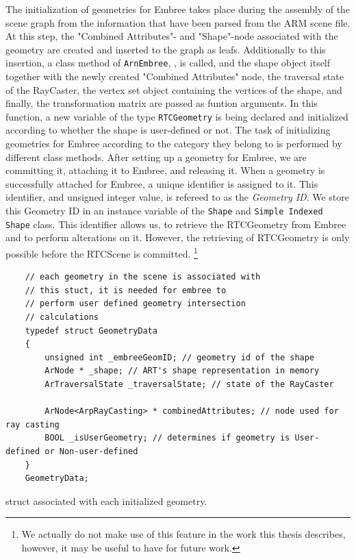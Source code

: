 The initialization of geometries for Embree takes place during the assembly of the scene graph from the information that have been parsed from the ARM scene file. At this step, the "Combined Attributes"- and "Shape"-node associated with the geometry are created and inserted to the graph as leafs. Additionally to this insertion, a class method of \texttt{ArnEmbree}, , is called, and the shape object itself together with the newly created "Combined Attributes" node, the traversal state  of the RayCaster, the vertex set object containing the vertices of the shape, and finally, the transformation matrix are passed as funtion arguments. In this function, a new variable of the type \texttt{RTCGeometry} is being declared and initialized according to whether the shape is user-defined or not. The task of initializing geometries for Embree according to the category they belong to is performed by different class methods. After setting up a geometry for Embree, we are committing it, attaching it to Embree, and releasing it. When a geometry is successfully attached for Embree, a unique identifier is assigned to it. This identifier, and unsigned integer value, is refereed to as the \emph{Geometry ID}. We store this Geometry ID in an instance variable of the \texttt{Shape} and \texttt{Simple Indexed Shape} class. This identifier allows us, to retrieve the RTCGeometry from Embree and to perform alterations on it. However, the retrieving of RTCGeometry is only possible before the RTCScene is committed. \footnote{We actually do not make use of this feature in the work this thesis describes, however, it may be useful to have for future work.}

\begin{listing} 
	\begin{lstlisting}
	// each geometry in the scene is associated with
	// this stuct, it is needed for embree to
	// perform user defined geometry intersection
	// calculations
	typedef struct GeometryData 
	{
		unsigned int _embreeGeomID; // geometry id of the shape
		ArNode * _shape; // ART's shape representation in memory
		ArTraversalState _traversalState; // state of the RayCaster
		
		ArNode<ArpRayCasting> * combinedAttributes; // node used for ray casting
		BOOL _isUserGeometry; // determines if geometry is User-defined or Non-user-defined
	}
	GeometryData;
	\end{lstlisting}
	\caption{ struct associated with each initialized geometry.}
	\label{lst:geometry_data}
\end{listing}

